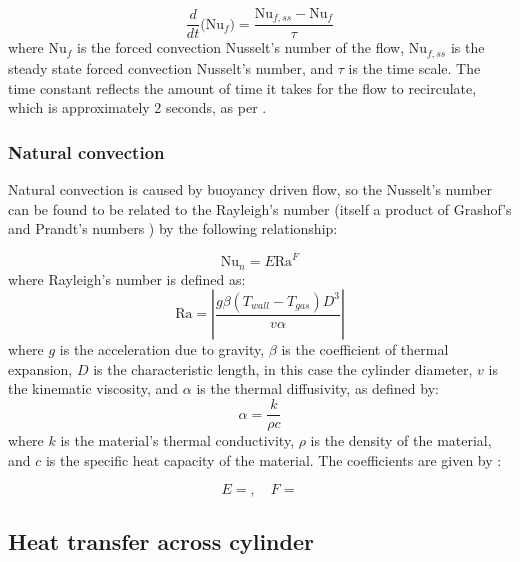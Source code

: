 \begin{equation}
\frac{d}{dt}\Big(\text{Nu}_f \Big) = \frac{\text{Nu}_{f,ss}-\text{Nu}_f}{\tau}
\end{equation}
where $\text{Nu}_f$ is the forced convection Nusselt's number of the flow, $\text{Nu}_{f,ss}$ is the steady state forced convection Nusselt's number, and $\tau$ is the time scale. The time constant reflects the amount of time it takes for the flow to recirculate, which is approximately 2 seconds, as per .

\subsubsection{Natural convection}
\label{sec:naturalConvection}

Natural convection is caused by buoyancy driven flow, so the Nusselt's number can be found to be related to the Rayleigh's number (itself a product of Grashof's and Prandt's numbers ) by the following relationship:

\begin{equation}
\text{Nu}_n  = E \text{Ra}^F
\end{equation}
where Rayleigh's number is defined as:
\begin{equation}
\text{Ra} = \left| \frac{g\beta\left(T_{wall} - T_{gas} \right) D^3}{v\alpha}\right|
\end{equation}
where $g$ is the acceleration due to gravity, $\beta$ is the coefficient of thermal expansion, $D$ is the characteristic length, in this case the cylinder diameter, $v$ is the kinematic viscosity, and $\alpha$ is the thermal diffusivity, as defined by:
\begin{equation}
\label{equ:thermalDiffusivity}
\alpha = \frac{k}{\rho c}
\end{equation}
where $k$ is the material's thermal conductivity, $\rho$ is the density of the material, and $c$ is the specific heat capacity of the material. The coefficients are given by :

\begin{equation}
E =   ,  \quad F = 
\end{equation}





\subsection{Heat transfer across cylinder}

